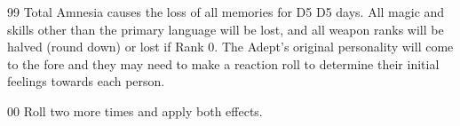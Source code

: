 \begin{multicols}{3}
\begin{Description}
\item[99] Total Amnesia causes the loss of all memories for D5 \x D5
days.  All magic and skills other than the primary language will be
lost, and all weapon ranks will be halved (round down) or lost if Rank
0.  The Adept's original personality will come to the fore and they
may need to make a reaction roll to determine their initial feelings
towards each person.

\item[00] Roll two more times and apply both effects.

\end{Description}

\raggedcolumns
\pagebreak
\end{multicols}

